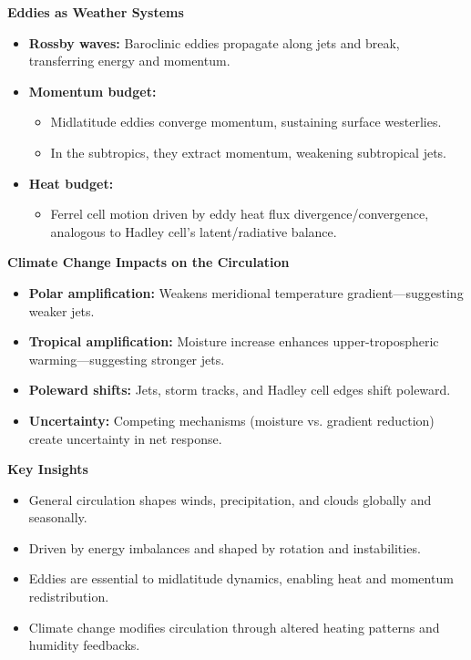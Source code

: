 \documentclass[fontsize=8pt, a4paper, landscape, fleqn]{scrartcl}
\renewcommand{\subsection}[1]{%
    \noindent\colorbox{subsectioncolor}{%
        \parbox{\dimexpr\columnwidth-2\fboxsep}{\color{white}\textbf{#1}}}%
    \vspace{0.5mm}%
}
\begin{document}
\begin{multicols*}{3}[\raggedcolumns]
\subsection{Eddies as Weather Systems}
\begin{itemize}
    \item \textbf{Rossby waves:} Baroclinic eddies propagate along jets and break, transferring energy and momentum.
    \item \textbf{Momentum budget:}
    \begin{itemize}
        \item Midlatitude eddies converge momentum, sustaining surface westerlies.
        \item In the subtropics, they extract momentum, weakening subtropical jets.
    \end{itemize}
    \item \textbf{Heat budget:}
    \begin{itemize}
        \item Ferrel cell motion driven by eddy heat flux divergence/convergence, analogous to Hadley cell's latent/radiative balance.
    \end{itemize}
\end{itemize}

\subsection{Climate Change Impacts on the Circulation}
\begin{itemize}
    \item \textbf{Polar amplification:} Weakens meridional temperature gradient—suggesting weaker jets.
    \item \textbf{Tropical amplification:} Moisture increase enhances upper-tropospheric warming—suggesting stronger jets.
    \item \textbf{Poleward shifts:} Jets, storm tracks, and Hadley cell edges shift poleward.
    \item \textbf{Uncertainty:} Competing mechanisms (moisture vs. gradient reduction) create uncertainty in net response.
\end{itemize}

\subsection{Key Insights}
\begin{itemize}
    \item General circulation shapes winds, precipitation, and clouds globally and seasonally.
    \item Driven by energy imbalances and shaped by rotation and instabilities.
    \item Eddies are essential to midlatitude dynamics, enabling heat and momentum redistribution.
    \item Climate change modifies circulation through altered heating patterns and humidity feedbacks.
\end{itemize}










\end{multicols*}
\end{document}
